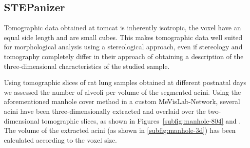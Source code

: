 
\subsection{STEPanizer}
Tomographic data obtained at \ac{tomcat} is inherently isotropic, \ie the voxel have an equal side length and are small cubes. This makes tomographic data well suited for morphological analysis using a stereological approach, even if stereology and tomography completely differ in their approach of obtaining a description of the three-dimensional characteristics of the studied sample.

Using tomographic slices of rat lung samples obtained at different postnatal days we assessed the number of alveoli per volume of the segmented acini. Using the aforementioned manhole cover method in a custom MeVisLab-Network, several acini have been three-dimensionally extracted and overlaid over the two-dimensional tomographic slices, as shown in Figures~\ref{subfig:manhole-804} and \label{subfig:manhole-1168}. The volume of the extracted acini (as shown in \autoref{subfig:manhole-3d}) has been calculated according to the voxel size.

